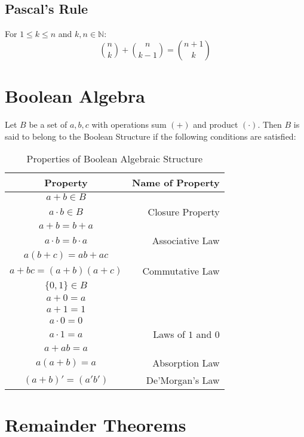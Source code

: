 \documentclass[openany, oneside]{book}
\begin{document}
\section{Pascal's Rule}
For $1 \leq k \leq n$ and  $k,n \in \mathbb{N}$:
\begin{equation}
{{n}\choose{k}}+{{n}\choose{k-1}} ={{n+1}\choose{k}} 
\end{equation}

\large{\chapter{Boolean Algebra}}
Let $B$ be a set of $a,b,c$ with operations sum $(+)$ and product $(\cdot)$.\newline
Then $B$ is said to belong to the Boolean Structure if the following conditions are satisfied:
\begin{table}[H]
\caption{Properties of Boolean Algebraic Structure}
\label{boolean}
\begin{center}
\begin{tabular}{c|r}
Property&Name of Property\\
\hline
$a+b \in B$\\$a \cdot b \in B$&Closure Property\\
\hline
$a+b=b+a$\\
$a \cdot b= b \cdot a$&Associative Law\\
\hline
$a(b+c) = ab + ac $\\
$a+bc=(a+b)(a+c)$&Commutative Law\\
\hline
$\lbrace 0,1 \rbrace \in B$\\
$a+0=a$\\
$a+1=1$\\
$a \cdot 0=0$\\
$a \cdot 1=a$&Laws of $1$ and $0$\\
\hline
$a+ab=a$\\
$a(a+b)=a$&Absorption Law\\
\hline
$(a+b)'=(a'b')$&De'Morgan's Law
\end{tabular}
\end{center}
\end{table}
\large{\chapter{Remainder Theorems}}
\end{document}
